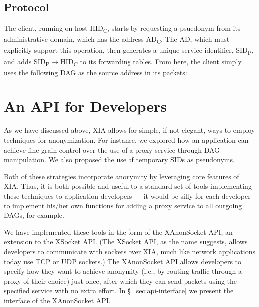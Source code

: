 \documentclass[11pt]{article}
\newcommand{\entrynode}[1]{
  \SetVertexNormal[Shape      = circle,
                   FillColor  = black,
                   LineWidth  = 0pt,
                   MinSize    = 0pt]
  \Vertex[L={\tiny\,}]{#1}
  \SetVertexNormal[Shape      = circle,
                   FillColor  = white,
                   LineWidth  = 2pt]
}
\begin{document}
\subsection{Protocol}

The client, running on host HID\textsubscript{C}, starts by requesting a psuedonym from its administrative domain, which has the address AD\textsubscript{C}.  The AD, which must explicitly support this operation, then generates a unique service identifier, SID\textsubscript{P}, and adds SID\textsubscript{P}$\rightarrow$HID\textsubscript{C} to its forwarding tables.  From here, the client simply uses the following DAG as the source address in its packets:

\begin{center}
\end{center}

\section{An API for Developers}
As we have discussed above, XIA allows for simple, if not elegant, ways to employ techniques for anonymization. For instance, we explored how an application can achieve fine-grain control over the use of a proxy service through DAG manipulation. We also proposed the use of temporary SIDs as pseudonyms.

Both of these strategies incorporate anonymity by leveraging core features of XIA. Thus, it is both possible and useful to a standard set of tools implementing these techniques to application developers --- it would be silly for each developer to implement his/her own functions for adding a proxy service to all outgoing DAGs, for example.

We have implemented these tools in the form of the XAnonSocket API, an extension to the XSocket API. (The XSocket API, as the name suggests, allows developers to communicate with sockets over XIA, much like network applications today use TCP or UDP sockets.) The XAnonSocket API allows developers to specify how they want to achieve anonymity (i.e., by routing traffic through a proxy of their choice) just once, after which they can send packets using the specified service with no extra effort. In \S~\ref{sec:api-interface} we present the interface of the XAnonSocket API.
\end{document}
